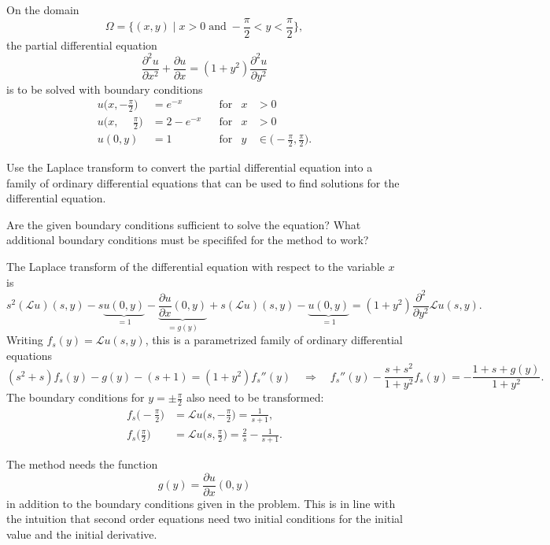 On the domain
\[
\Omega
=
\biggl\{(x,y)
\;\bigg|\;
x>0
\;\text{and}\;
-\frac{\pi}2 < y < \frac{\pi}2
\biggr\},
\]
the partial differential equation
\[
\frac{\partial^2 u}{\partial x^2}
+
\frac{\partial u}{\partial x}
=
(1+y^2)
\frac{\partial^2 u}{\partial y^2}
\]
is to be solved with boundary conditions
\[
\begin{aligned}
u\biggl(x,-\frac{\pi}2\biggr)           &= e^{-x}   &&\text{for}&x&>0\\
u\biggl(x,\phantom{-}\frac{\pi}2\biggr) &= 2-e^{-x} &&\text{for}&x&>0\\
u(0,y)                                  &= 1        &&\text{for}&y&\in\biggl(-\frac{\pi}2,\frac{\pi}2\biggr).
\end{aligned}
\]
\begin{teilaufgaben}
\item
Use the Laplace transform to convert the partial differential equation
into a family of ordinary differential equations that can be used to
find solutions for the differential equation.
\item
Are the given boundary conditions sufficient to solve the equation?
What additional boundary conditions must be specififed for the
method to work?
\end{teilaufgaben}

\begin{loesung}
\begin{teilaufgaben}
\item
The Laplace transform of the differential equation with respect to
the variable $x$ is
\[
s^2 (\mathscr{L}u)(s,y)
-
s
\underbrace{u(0,y)}_{\displaystyle=1}
-
\underbrace{\frac{\partial u}{\partial x}(0,y)}_{\displaystyle=g(y)}
+
s (\mathscr{L}u)(s,y)
-
\underbrace{u(0,y)}_{\displaystyle=1}
=
(1+y^2)\frac{\partial^2}{\partial y^2}
\mathscr{L}u(s,y).
\]
Writing $f_s(y) = \mathscr{L}u(s,y)$, this is a parametrized
family of ordinary differential equations
\begin{equation*}
(s^2+s) f_s(y) - g(y) - (s+1) = (1+y^2)f_s''(y)
\quad\Rightarrow\quad
f_s''(y) - \frac{s+s^2}{1+y^2}f_s(y)
=
-
\frac{1+s+g(y)}{1+y^2}.
\end{equation*}
The boundary conditions for $y=\pm\frac{\pi}2$ also need to be 
transformed:
\[
\begin{aligned}
f_s\biggl(-\frac{\pi}2\biggr)
&=
\mathscr{L}u\biggl(s,-\frac{\pi}2\biggr) = \frac{1}{s+1},
\\
f_s\biggl(\frac{\pi}2\biggr)
&=
\mathscr{L}u\biggl(s,\frac{\pi}2\biggr)
=
\frac{2}{s} - \frac{1}{s+1}.
\end{aligned}
\]
\item
The method needs the function
\[
g(y) = \frac{\partial u}{\partial x}(0,y)
\]
in addition to the boundary conditions given in the problem.
This is in line with the intuition that second order equations 
need two initial conditions for the initial value and the initial
derivative.
\qedhere
\end{teilaufgaben}
\end{loesung}

